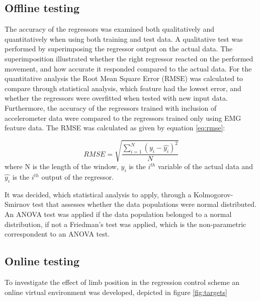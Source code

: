 \begin{multicols}{2}
\subsection{Offline testing}
The accuracy of the regressors was examined both qualitatively and quantitatively when using both training and test data. A qualitative test was performed by superimposing the regressor output on the actual data. The superimposition illustrated whether the right regressor reacted on the performed movement, and how accurate it responded compared to the actual data. For the quantitative analysis the Root Mean Square Error (RMSE) was calculated to compare through statistical analysis, which feature had the lowest error, and whether the regressors were overfitted when tested with new input data. Furthermore, the accuracy of the regressors trained with inclusion of accelerometer data were compared to the regressors trained only using EMG feature data. The RMSE was calculated as given by equation \ref{eq:rmse}:

\begin{equation} \label{eq:rmse}
RMSE = \sqrt{\frac{\sum\limits_{i=1}^N(y_i - \hat{y_i})^2}{N}}
\end{equation}
where N is the length of the window, $y_i$ is the $i^{th}$ variable of the actual data and $\hat{y_i}$ is the $i^{th}$ output of the regressor.

It was decided, which statistical analysis to apply, through a Kolmogorov-Smirnov test that assesses whether the data populations were normal distributed. An ANOVA test was applied if the data population belonged to a normal distribution, if not a Friedman's test was applied, which is the non-parametric correspondent to an ANOVA test.

\subsection{Online testing}
To investigate the effect of limb position in the regression control scheme an online virtual environment was developed, depicted in figure \ref{fig:targets}


\end{multicols}
